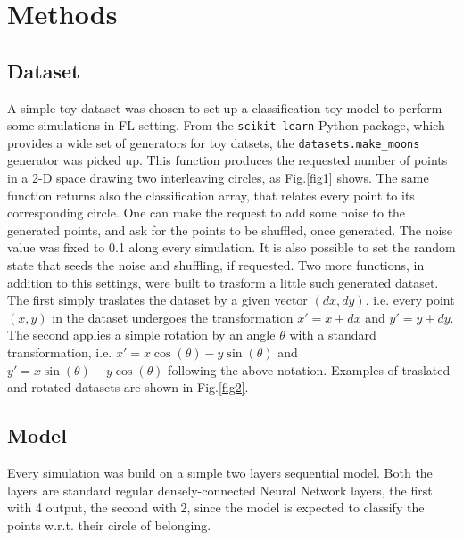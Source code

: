 \documentclass{article} %
\newcounter{points}
\newcounter{late}
\begin{document}
\section {Methods}

\subsection{Dataset}
A simple toy dataset was chosen to set up a classification toy model to perform some 
simulations in FL setting.
From the \verb|scikit-learn| Python package, which provides a wide set of generators 
for toy datsets, the \verb|datasets.make_moons| generator was picked up.
This function produces the requested number of points in a 2-D space drawing two 
interleaving circles, as Fig.\ref{fig1} shows. 
The same function returns also the classification array, that relates every point to 
its corresponding circle.
One can make the request to add some noise to the generated points, and ask for the 
points to be shuffled, once generated.
The noise value was fixed to 0.1 along every simulation.
It is also possible to set the random state that seeds the noise and shuffling, if 
requested.
Two more functions, in addition to this settings, were built to trasform a little 
such generated dataset.
The first simply traslates the dataset by a given vector $(dx, dy)$, i.e. every 
point $(x, y)$ in the dataset undergoes the transformation $x'=x+dx$ and $y'=y+dy$.
The second applies a simple rotation by an angle $\theta$ with a standard transformation,
i.e. $x'=x\cos(\theta)-y\sin(\theta)$ and $y'=x\sin(\theta)-y\cos(\theta)$ following 
the above notation.
Examples of traslated and rotated datasets are shown in Fig.\ref{fig2}.

\subsection{Model}
Every simulation was build on a simple two layers sequential model.
Both the layers are standard regular densely-connected Neural Network layers, the first 
with 4 output, the second with 2, since the model is expected to classify the points 
w.r.t. their circle of belonging.
\end{document}
